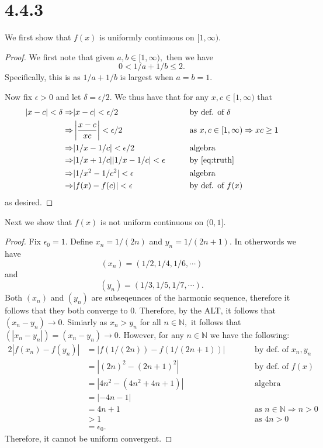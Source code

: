\documentclass[10pt]{article}
\begin{document}
\section*{4.4.3}
We first show that $f(x)$ is uniformly continuous on $[1,\infty).$
\begin{proof}
    We first note that given $a,b\in [1,\infty),$ then we have
    \begin{equation} \label{eq:truth}
        0<1/a+1/b\le 2.
    \end{equation}
    Specifically, this is as $1/a+1/b$ is largest when $a=b=1.$

    Now fix $\epsilon > 0$ and let $\delta = \epsilon/2.$ We thus have that for any $x,c\in[1,\infty)$ that
    \begin{alignat*}{2} %
        |x-c|<\delta \Rightarrow& |x-c|<\epsilon/2 &&\text{by def. of }\delta\\
        \Rightarrow& \left | \frac{x-c}{xc}\right | < \epsilon/2 &&\text{as }x,c\in[1,\infty)\Rightarrow xc\ge 1\\
        \Rightarrow& |1/x-1/c|<\epsilon/2 &&\text{algebra}\\
        \Rightarrow&|1/x+1/c||1/x-1/c|<\epsilon \qquad&&\text{by \eqref{eq:truth}}\\
        \Rightarrow& |1/x^2-1/c^2|<\epsilon&&\text{algebra}\\
        \Rightarrow& |f(x)-f(c)|<\epsilon&&\text{by def. of }f(x)
    \end{alignat*} 
    as desired.
\end{proof}

\noindent
Next we show that $f(x)$ is not uniform continuous on $(0,1].$

\begin{proof}
    Fix $\epsilon_0=1.$ Define $x_n=  1/(2n)$ and $y_n = 1/(2n+1).$
    In otherwords we have
    $$(x_n) = (1/2,1/4,1/6,\cdots)$$ and $$(y_n)=(1/3,1/5,1/7,\cdots).$$
    Both $(x_n)$ and $(y_n)$ are subseqeunces of the harmonic sequence, therefore it follows that they both converge to $0.$ Therefore, by the ALT, it follows that $(x_n-y_n)\to 0.$ Simiarly as $x_n>y_n$ for all $n\in\mathbb{N},$ it follows that $(|x_n-y_n|)=(x_n-y_n)\to0.$ However, for any $n\in\mathbb{N}$ we have the following:
    \begin{alignat*}{2}
        |f(x_n)-f(y_n)| &= |f(1/(2n))-f(1/(2n+1))|\qquad &&\text{by def. of }x_n,y_n\\
        &= |(2n)^2 - (2n+1)^2| &&\text{by def. of }f(x)\\
        &= |4n^2 - (4n^2 +4n + 1)|&&\text{algebra}\\
        &= |-4n-1|\\
        &= 4n+1 &&\text{as }n\in\mathbb{N}\Rightarrow n>0\\
        &> 1 &&\text{as }4n>0\\
        & = \epsilon_0.
    \end{alignat*}
    Therefore, it cannot be uniform convergent.
\end{proof}
\end{document}
